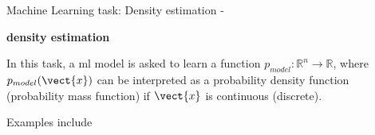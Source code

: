 
\begin{frame}[t,allowframebreaks]{
    Machine Learning task: Density estimation - }

    {\bf {}\Gls{density estimation}} \\
    \vspace{0.1cm}
    \begin{itemize}
        {
            \item
            In this task, a \gls{ml} model is asked to
            learn a function $p_{model}: \mathbb{R}^n \rightarrow \mathbb{R}$,
            where $p_{model}(\vect{x})$ can be interpreted as a 
            \gls{probability density function} 
            (\gls{probability mass function}) 
            if $\vect{x}$ is continuous (discrete).\\
            \vspace{0.1cm}
            \item
            Examples include \\
        }
    \end{itemize}

\end{frame}